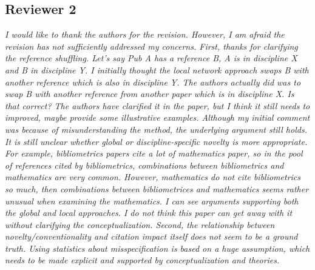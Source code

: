 \documentclass[11pt, oneside]{article}   	%
\begin{document}
\subsection{Reviewer 2}

\emph{I would like to thank the authors for the revision.  However, I am afraid the revision has not sufficiently addressed my concerns. First, thanks for clarifying the reference shuffling.  Let’s say Pub A has a reference B, A is in discipline X and B in discipline Y.  I initially thought the local network approach swaps B with another reference which is also in discipline Y.  The authors actually did was to swap B with another reference from another paper which is in discipline X.  Is that correct?  The authors have clarified it in the paper, but I think it still needs to improved, maybe provide some illustrative examples.  Although my initial comment was because of misunderstanding the method, the underlying argument still holds.  It is still unclear whether global or discipline-specific novelty is more appropriate.  For example, bibliometrics papers cite a lot of mathematics paper, so in the pool of references cited by bibliometrics, combinations between bibliometrics and mathematics are very common. However, mathematics do not cite bibliometrics so much, then combinations between bibliometrices and mathematics seems rather unusual when examining the mathematics. I can see arguments supporting both the global and local approaches. I do not think this paper can get away with it without clarifying the conceptualization. Second, the relationship between novelty/conventionality and citation impact itself does not seem to be a ground truth. Using statistics about misspecification is based on a huge assumption, which needs to be made explicit and supported by conceptualization and theories.}
\end{document}
